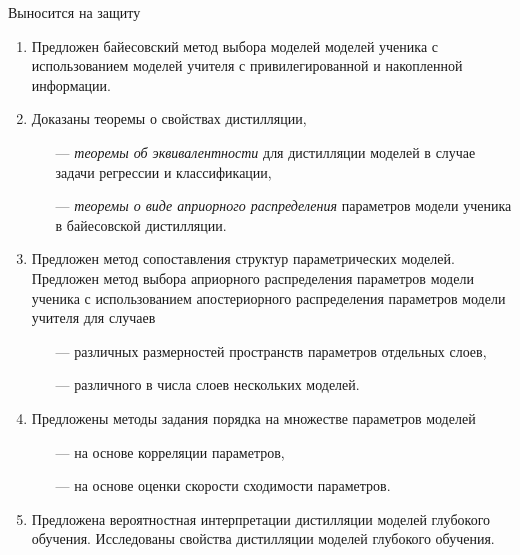 \documentclass[10pt,pdf,hyperref={unicode}]{beamer}
\begin{document}
\begin{frame}{Выносится на защиту}
\justifying
	\begin{enumerate}
	\justifying
	    \item Предложен байесовский метод выбора моделей моделей ученика с использованием моделей учителя с привилегированной и накопленной информации.
        \item Доказаны теоремы о свойствах дистилляции, 
        \begin{itemize}
            \item[---] \emph{теоремы об эквивалентности} для дистилляции моделей в случае задачи регрессии и классификации,
            \item[---] \emph{теоремы о виде априорного распределения} параметров модели ученика в байесовской дистилляции.
        \end{itemize}
        \item Предложен метод сопоставления структур параметрических моделей. Предложен метод выбора априорного распределения параметров модели ученика с использованием апостериорного распределения параметров модели учителя для случаев
        \begin{itemize}
            \item[---] различных размерностей пространств параметров отдельных слоев,
            \item[---] различного в числа слоев нескольких моделей.
        \end{itemize}
        \item Предложены методы задания порядка на множестве параметров моделей
        \begin{itemize}
            \item[---] на основе корреляции параметров,
            \item[---] на основе оценки скорости сходимости параметров.
        \end{itemize}
        \item Предложена вероятностная интерпретации дистилляции моделей глубокого обучения. Исследованы свойства дистилляции моделей глубокого обучения.
	\end{enumerate}
\end{frame}
\end{document}
